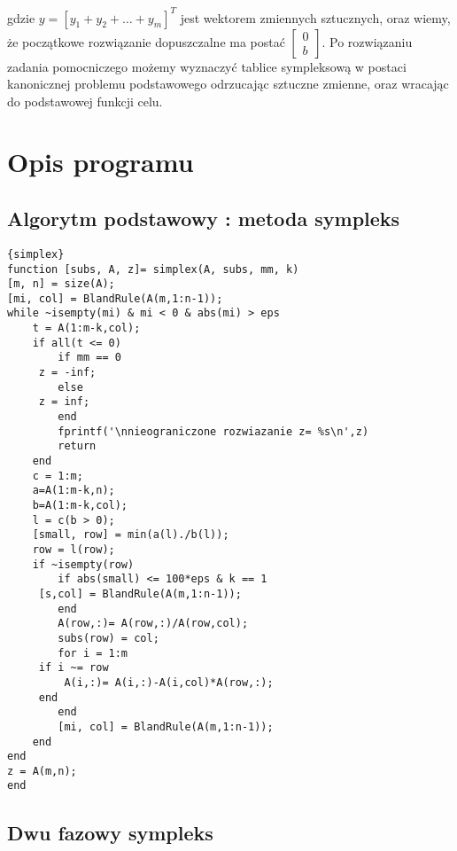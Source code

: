 \documentclass{classrep}
\begin{document}
gdzie $y=[y_1+y_2+\dots+y_m]^{T}$ jest wektorem zmiennych sztucznych, oraz wiemy, że początkowe rozwiązanie dopuszczalne ma postać $\left[ \begin{smallmatrix} 0\\b \end{smallmatrix} \right]$. Po rozwiązaniu zadania pomocniczego możemy wyznaczyć tablice sympleksową w postaci kanonicznej problemu  podstawowego odrzucając sztuczne zmienne, oraz wracając do podstawowej funkcji celu.

\section{Opis programu}


\subsection{Algorytm podstawowy : metoda sympleks}

\begin{lstlisting}{simplex}
function [subs, A, z]= simplex(A, subs, mm, k)
[m, n] = size(A);
[mi, col] = BlandRule(A(m,1:n-1));
while ~isempty(mi) & mi < 0 & abs(mi) > eps
    t = A(1:m-k,col);
    if all(t <= 0)
        if mm == 0
     z = -inf;
        else
     z = inf;
        end
        fprintf('\nnieograniczone rozwiazanie z= %s\n',z)
        return
    end
    c = 1:m;
    a=A(1:m-k,n);
    b=A(1:m-k,col);
    l = c(b > 0);
    [small, row] = min(a(l)./b(l));
    row = l(row);
    if ~isempty(row)
        if abs(small) <= 100*eps & k == 1
     [s,col] = BlandRule(A(m,1:n-1));
        end
        A(row,:)= A(row,:)/A(row,col);
        subs(row) = col;
        for i = 1:m
     if i ~= row
         A(i,:)= A(i,:)-A(i,col)*A(row,:);
     end
        end
        [mi, col] = BlandRule(A(m,1:n-1));
    end
end
z = A(m,n);
end
\end{lstlisting}


\subsection{Dwu fazowy sympleks}
\end{document}
